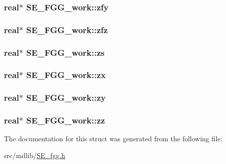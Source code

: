 \hypertarget{structSE__FGG__work_aa61877435a9f8381b917e3c0fc9737cc}{
\subsubsection[{zfy}]{\setlength{\rightskip}{0pt plus 5cm}real$\ast$ {\bf \-S\-E\-\_\-\-F\-G\-G\-\_\-work\-::zfy}}}\label{structSE__FGG__work_aa61877435a9f8381b917e3c0fc9737cc}
\hypertarget{structSE__FGG__work_a2ee6c14c25b8a8c7629581d5cf7c2382}{
\subsubsection[{zfz}]{\setlength{\rightskip}{0pt plus 5cm}real$\ast$ {\bf \-S\-E\-\_\-\-F\-G\-G\-\_\-work\-::zfz}}}\label{structSE__FGG__work_a2ee6c14c25b8a8c7629581d5cf7c2382}
\hypertarget{structSE__FGG__work_a3262546f3a8091c4839492997113ebad}{
\subsubsection[{zs}]{\setlength{\rightskip}{0pt plus 5cm}real$\ast$ {\bf \-S\-E\-\_\-\-F\-G\-G\-\_\-work\-::zs}}}\label{structSE__FGG__work_a3262546f3a8091c4839492997113ebad}
\hypertarget{structSE__FGG__work_a55f72cf0a709775889220d37dc490956}{
\subsubsection[{zx}]{\setlength{\rightskip}{0pt plus 5cm}real$\ast$ {\bf \-S\-E\-\_\-\-F\-G\-G\-\_\-work\-::zx}}}\label{structSE__FGG__work_a55f72cf0a709775889220d37dc490956}
\hypertarget{structSE__FGG__work_a89fdd99eae3cfd862b43338c074d1984}{
\subsubsection[{zy}]{\setlength{\rightskip}{0pt plus 5cm}real$\ast$ {\bf \-S\-E\-\_\-\-F\-G\-G\-\_\-work\-::zy}}}\label{structSE__FGG__work_a89fdd99eae3cfd862b43338c074d1984}
\hypertarget{structSE__FGG__work_a4eab998a78389fe7063fa6972cc9a78d}{
\subsubsection[{zz}]{\setlength{\rightskip}{0pt plus 5cm}real$\ast$ {\bf \-S\-E\-\_\-\-F\-G\-G\-\_\-work\-::zz}}}\label{structSE__FGG__work_a4eab998a78389fe7063fa6972cc9a78d}


\-The documentation for this struct was generated from the following file\-:\begin{DoxyCompactItemize}
\item 
src/mdlib/\hyperlink{SE__fgg_8h}{\-S\-E\-\_\-fgg.\-h}\end{DoxyCompactItemize}
